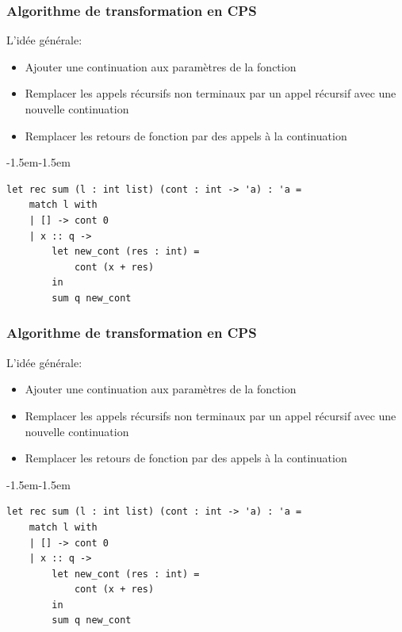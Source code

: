 \addtocounter{framenumber}{-1}
\begin{frame}[fragile,t]
    \frametitle{Algorithme de transformation en CPS}

    L'idée générale:
    \begin{itemize}
        \item Ajouter une continuation aux paramètres de la fonction
        \item Remplacer les appels récursifs non terminaux par un appel récursif
              avec une nouvelle continuation
        \item[\textcolor{orange}{$\blacktriangleright$}] Remplacer les retours de fonction par des appels à la continuation
    \end{itemize}

    \vspace{0.1cm}

    \begin{adjustwidth}{-1.5em}{-1.5em}
        \begin{verbatim}
let rec sum (l : int list) (cont : int -> 'a) : 'a =
    match l with
    | [] -> cont 0
    | x :: q -> 
        let new_cont (res : int) =
            cont (x + res)
        in
        sum q new_cont
        \end{verbatim}
    \end{adjustwidth}

\end{frame}

\addtocounter{framenumber}{-1}
\begin{frame}[fragile,t]
    \frametitle{Algorithme de transformation en CPS}

    L'idée générale:
    \begin{itemize}
        \item Ajouter une continuation aux paramètres de la fonction
        \item Remplacer les appels récursifs non terminaux par un appel récursif
              avec une nouvelle continuation
        \item Remplacer les retours de fonction par des appels à la continuation
    \end{itemize}

    \vspace{0.1cm}

    \begin{adjustwidth}{-1.5em}{-1.5em}
        \begin{verbatim}
let rec sum (l : int list) (cont : int -> 'a) : 'a =
    match l with
    | [] -> cont 0
    | x :: q -> 
        let new_cont (res : int) =
            cont (x + res)
        in
        sum q new_cont
        \end{verbatim}
    \end{adjustwidth}
\end{frame}
